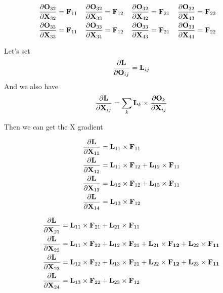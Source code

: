 \begin{align}
  \frac{\partial \bold{O}_{32}}{\partial \bold{X}_{32}} = \bold{F}_{11}\;\;\;\;
  \frac{\partial \bold{O}_{32}}{\partial \bold{X}_{33}} = \bold{F}_{12}\;\;\;\;
  \frac{\partial \bold{O}_{32}}{\partial \bold{X}_{42}} = \bold{F}_{21}\;\;\;\;
  \frac{\partial \bold{O}_{32}}{\partial \bold{X}_{43}} = \bold{F}_{22}\;\;\;\;\\
  \frac{\partial \bold{O}_{33}}{\partial \bold{X}_{33}} = \bold{F}_{11}\;\;\;\;
  \frac{\partial \bold{O}_{33}}{\partial \bold{X}_{34}} = \bold{F}_{12}\;\;\;\;
  \frac{\partial \bold{O}_{33}}{\partial \bold{X}_{43}} = \bold{F}_{21}\;\;\;\;
  \frac{\partial \bold{O}_{33}}{\partial \bold{X}_{44}} = \bold{F}_{22}\;\;\;\;\\
\end{align}

Let's set
\begin{equation}
  \frac{\partial \bold{L}}{\partial \bold{O}_{ij}} = \bold{L}_{ij}
\end{equation}
And we also have
\begin{align}\label{eq:gradient_X}
  \frac{\partial \bold{L}}{\partial \bold{X}_{ij}}=\sum_k\bold{L}_{k}\times\frac{\partial \bold{O}_k}{\partial \bold{X}_{ij}}
\end{align}

Then we can get the X gradient

\begin{align}
  \frac{\partial \bold{L}}{\partial \bold{X}_{11}} &= \bold{L}_{11}\times \bold{F}_{11} \\
  \frac{\partial \bold{L}}{\partial \bold{X}_{12}} &= \bold{L}_{11}\times \bold{F}_{12} +  \bold{L}_{12}\times \bold{F}_{11}\\
  \frac{\partial \bold{L}}{\partial \bold{X}_{13}} &= \bold{L}_{12}\times \bold{F}_{12} +  \bold{L}_{13}\times \bold{F}_{11}\\
  \frac{\partial \bold{L}}{\partial \bold{X}_{14}} &= \bold{L}_{13}\times \bold{F}_{12}
\end{align}

\begin{align}
  \frac{\partial \bold{L}}{\partial \bold{X}_{21}} &= \bold{L}_{11}\times \bold{F}_{21} + \bold{L}_{21}\times \bold{F}_{11} \\
  \frac{\partial \bold{L}}{\partial \bold{X}_{22}} &= \bold{L}_{11}\times \bold{F}_{22} + \bold{L}_{12}\times \bold{F}_{21} + \bold{L}_{21}\times \bold{F_{12}} + \bold{L}_{22}\times \bold{F_{11}}\\
  \frac{\partial \bold{L}}{\partial \bold{X}_{23}} &= \bold{L}_{12}\times \bold{F}_{22} + \bold{L}_{13}\times \bold{F}_{21} + \bold{L}_{22}\times \bold{F_{12}} + \bold{L}_{23}\times \bold{F_{11}}\\
  \frac{\partial \bold{L}}{\partial \bold{X}_{24}} &= \bold{L}_{13}\times \bold{F}_{22} + \bold{L}_{23}\times \bold{F}_{12}\\
\end{align}

